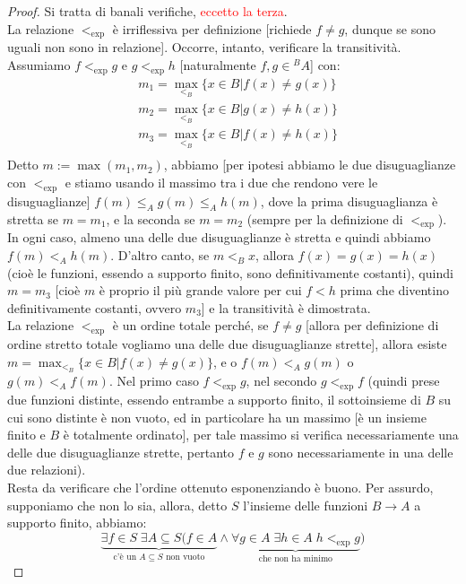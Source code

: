 \documentclass[11pt]{scrartcl}
\begin{document}
\begin{proof}
	Si tratta di banali verifiche, \textcolor{red}{eccetto la terza}.\\
	La relazione $<_{\exp}$ è irriflessiva per definizione [richiede $f \ne g$, dunque se sono uguali non sono in relazione]. Occorre, intanto, verificare la transitività.
	Assumiamo $f <_{\exp} g$ e $g <_{\exp} h$ [naturalmente $f,g \in {}^BA$] con:
	\begin{align*}
		&m_1 = \max_{<_B}\{x\in B | f(x) \ne g(x)\} \\
		&m_2 = \max_{<_B}\{x\in B | g(x) \ne h(x)\} \\
		&m_3 = \max_{<_B}\{x\in B | f(x) \ne h(x)\} \\
	\end{align*}
	Detto $m := \max(m_1,m_2)$, abbiamo [per ipotesi abbiamo le due disuguaglianze con $<_{\exp}$ e stiamo usando il massimo tra i due che rendono vere le disuguaglianze] $f(m) \leq_A g(m) \leq_A h(m)$, dove la prima disuguaglianza è
	stretta se $m = m_1$, e la seconda se $m = m_2$ (sempre per la definizione di $<_{\exp}$).  In ogni caso, almeno una delle due disuguaglianze è stretta e quindi abbiamo $f(m) <_A h(m)$.
	D'altro canto, se $m  <_B x$, allora $f(x) = g(x) = h(x)$ (cioè le funzioni, essendo a supporto finito, sono definitivamente costanti), quindi $m = m_3$ [cioè $m$ è proprio il più grande valore per cui $f<h$ prima che diventino definitivamente costanti, ovvero $m_3$] e la transitività è dimostrata.\\
	La relazione $<_{\exp}$ è un ordine totale perché, se $f \ne g$ [allora per definizione di ordine stretto totale vogliamo una delle due disuguaglianze strette], allora esiste $m = \max_{<_B}\{x \in B | f(x) \ne g(x)\}$, e o $f(m)<_A g(m)$ o $g(m) <_A f(m)$. Nel primo caso $f <_{\exp} g$, nel secondo $g <_{\exp} f$ (quindi prese due funzioni distinte, essendo entrambe a supporto finito, il sottoinsieme di $B$
	su cui sono distinte è non vuoto, ed in particolare ha un massimo [è un insieme finito e $B$ è totalmente ordinato], per tale massimo si verifica necessariamente una delle due disuguaglianze strette, pertanto $f$ e $g$ sono necessariamente in una delle due relazioni).\\
	Resta da verificare che l'ordine ottenuto esponenziando è buono. Per assurdo, supponiamo che non lo sia, allora, detto $S$ l'insieme delle funzioni $B \rightarrow A$ a supporto finito, abbiamo:
	\[ \underbrace{\exists f \in S \; \exists A \subseteq S (f \in A}_{\text{c'è un $A \subseteq S$ non vuoto}}\land\underbrace{\forall g \in A \; \exists h \in A \; h <_{\exp} g}_{\text{che non ha minimo}})
\]
\end{proof}
\end{document}

